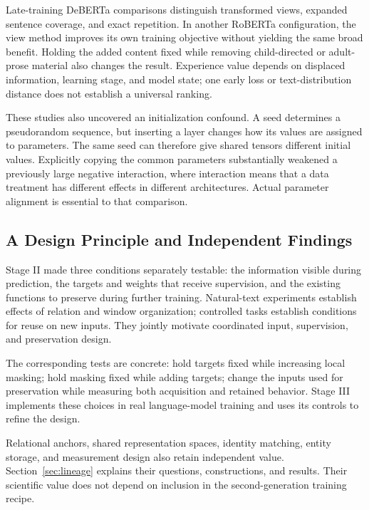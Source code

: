 Late-training DeBERTa comparisons distinguish transformed views, expanded sentence coverage, and exact repetition. In another RoBERTa configuration, the view method improves its own training objective without yielding the same broad benefit. Holding the added content fixed while removing child-directed or adult-prose material also changes the result. Experience value depends on displaced information, learning stage, and model state; one early loss or text-distribution distance does not establish a universal ranking.

These studies also uncovered an initialization confound. A seed determines a pseudorandom sequence, but inserting a layer changes how its values are assigned to parameters. The same seed can therefore give shared tensors different initial values. Explicitly copying the common parameters substantially weakened a previously large negative interaction, where interaction means that a data treatment has different effects in different architectures. Actual parameter alignment is essential to that comparison.

\subsection{A Design Principle and Independent Findings}

Stage II made three conditions separately testable: the information visible during prediction, the targets and weights that receive supervision, and the existing functions to preserve during further training. Natural-text experiments establish effects of relation and window organization; controlled tasks establish conditions for reuse on new inputs. They jointly motivate coordinated input, supervision, and preservation design.

The corresponding tests are concrete: hold targets fixed while increasing local masking; hold masking fixed while adding targets; change the inputs used for preservation while measuring both acquisition and retained behavior. Stage III implements these choices in real language-model training and uses its controls to refine the design.

Relational anchors, shared representation spaces, identity matching, entity storage, and measurement design also retain independent value. Section~\ref{sec:lineage} explains their questions, constructions, and results. Their scientific value does not depend on inclusion in the second-generation training recipe.
